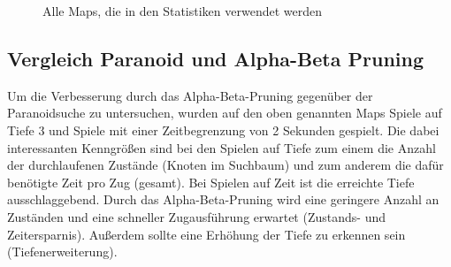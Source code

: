 \documentclass[12pt,a4paper,bibliography=totocnumbered,listof=totocnumbered]{scrartcl}
\begin{document}
\begin{figure}
		\qquad
		\qquad

		\caption{Alle Maps, die in den Statistiken verwendet werden}
		\label{fig:statistik_maps}
	\end{figure}
	
	\newpage
	
    \subsection{Vergleich Paranoid und Alpha-Beta Pruning}
    \vspace{1em} 
    
    Um die Verbesserung durch das Alpha-Beta-Pruning gegenüber der Paranoidsuche zu untersuchen, wurden auf den oben genannten Maps Spiele auf Tiefe 3 und Spiele mit einer Zeitbegrenzung von 2 Sekunden gespielt. Die dabei interessanten Kenngrößen sind bei den Spielen auf Tiefe zum einem die Anzahl der durchlaufenen Zustände (Knoten im Suchbaum) und zum anderem die dafür benötigte Zeit pro Zug (gesamt). Bei Spielen auf Zeit ist die erreichte Tiefe ausschlaggebend. Durch das Alpha-Beta-Pruning wird eine geringere Anzahl an Zuständen und eine schneller Zugausführung erwartet (Zustands- und Zeitersparnis). Außerdem sollte eine Erhöhung der Tiefe zu erkennen sein (Tiefenerweiterung).\newline
    
\end{document}
